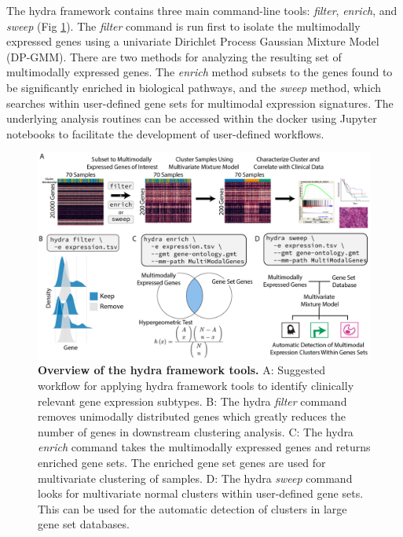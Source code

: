 \documentclass[10pt,letterpaper]{article}
\begin{document}
The hydra framework contains three main command-line tools: \textit{filter}, \textit{enrich}, and \textit{sweep} (Fig \ref{overview}). The \textit{filter} command is run first to isolate the multimodally expressed genes using a univariate Dirichlet Process Gaussian Mixture Model (DP-GMM). There are two methods for analyzing the resulting set of multimodally expressed genes. The \textit{enrich} method subsets to the genes found to be significantly enriched in biological pathways, and the \textit{sweep} method, which searches within user-defined gene sets for multimodal expression signatures. The underlying analysis routines can be accessed within the docker using Jupyter notebooks to facilitate the development of user-defined workflows.

\begin{figure}[h!]
	\includegraphics[width=\textwidth]{"img/PNG/overview-fig"}
	\caption{{\bf Overview of the hydra framework tools.}
		A: Suggested workflow for applying hydra framework tools to identify clinically relevant gene expression subtypes. B: The hydra \textit{filter} command removes unimodally distributed genes which greatly reduces the number of genes in downstream clustering analysis. C: The hydra \textit{enrich} command takes the multimodally expressed genes and returns enriched gene sets. The enriched gene set genes are used for multivariate clustering of samples. D: The hydra 
	    \textit{sweep} command looks for multivariate normal clusters within user-defined gene sets. This can be used for the automatic detection of clusters in large gene set databases.
		\label{overview}}
\end{figure}
\end{document}
